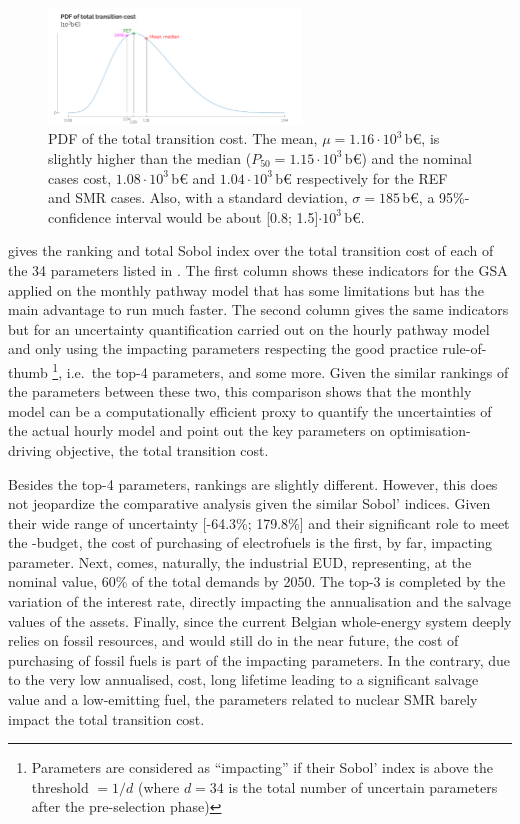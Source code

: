 \documentclass[11pt,twoside,a4paper,english]{article}
\def\ie{i.e.\ }
\begin{document}
\begin{appendices}
\begin{figure}[!htbp]
\centering
\includegraphics[width=0.6\textwidth]{figures/UQ_PDF_total_transition_cost.pdf}
\caption{\acrfull{PDF} of the total transition cost. The mean, $\mu=1.16\cdot10^3$\,b€, is slightly higher than the median ($P_{50}=1.15\cdot10^3$\,b€) and the nominal cases cost, $1.08\cdot10^3$\,b€ and $1.04\cdot10^3$\,b€ respectively for the REF and SMR cases. Also, with a standard deviation, $\sigma=185$\,b€, a 95\%-confidence interval would be about [0.8; 1.5]$\cdot10^3$\,b€.}
\label{fig:UQ_PDF_total_transition_cost}
\end{figure}

 gives the ranking and total Sobol index over the total transition cost of each of the 34 parameters listed in . The first column shows these indicators for the \gls{GSA} applied on the monthly pathway model that has some limitations \cite{limpens2023pathway} but has the main advantage to run much faster. The second column gives the same indicators but for an uncertainty quantification carried out on the hourly pathway model and only using the impacting parameters respecting the good practice rule-of-thumb \cite{Turati2017}\footnote{Parameters are considered as ``impacting'' if their Sobol' index is above the threshold $= 1/d$ (where $d=34$ is the total number of uncertain parameters after the pre-selection phase)}, \ie the top-4 parameters, and some more. Given the similar rankings of the parameters between these two, this comparison shows that the monthly model can be a computationally efficient proxy to quantify the uncertainties of the actual hourly model and point out the key parameters on optimisation-driving objective, the total transition cost. 

Besides the top-4 parameters, rankings are slightly different. However, this does not jeopardize the comparative analysis given the similar Sobol' indices. Given their wide range of uncertainty [-64.3\%; 179.8\%] and their significant role to meet the -budget, the cost of purchasing of electrofuels is the first, by far, impacting parameter. Next, comes, naturally, the industrial \gls{EUD}, representing, at the nominal value, 60\% of the total demands by 2050. The top-3 is completed by the variation of the interest rate, directly impacting the annualisation and the salvage values of the assets. Finally, since the current Belgian whole-energy system deeply relies on fossil resources, and would still do in the near future, the cost of purchasing of fossil fuels is part of the impacting parameters. In the contrary, due to the very low annualised, cost, long lifetime leading to a significant salvage value  and a low-emitting fuel, the parameters related to nuclear SMR barely impact the total transition cost.


\end{appendices}
\end{document}

